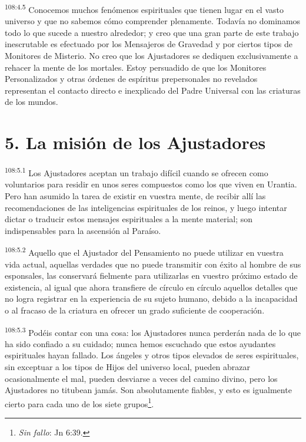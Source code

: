 \documentclass[twoside, 11pt]{book}
\begin{document}
\par
\textsuperscript{108:4.5} Conocemos muchos fenómenos espirituales que tienen lugar en el vasto universo y que no sabemos cómo comprender plenamente. Todavía no dominamos todo lo que sucede a nuestro alrededor; y creo que una gran parte de este trabajo inescrutable es efectuado por los Mensajeros de Gravedad y por ciertos tipos de Monitores de Misterio. No creo que los Ajustadores se dediquen exclusivamente a rehacer la mente de los mortales. Estoy persuadido de que los Monitores Personalizados y otras órdenes de espíritus prepersonales no revelados representan el contacto directo e inexplicado del Padre Universal con las criaturas de los mundos.

\section*{5. La misión de los Ajustadores}
\par
\textsuperscript{108:5.1} Los Ajustadores aceptan un trabajo difícil cuando se ofrecen como voluntarios para residir en unos seres compuestos como los que viven en Urantia. Pero han asumido la tarea de existir en vuestra mente, de recibir allí las recomendaciones de las inteligencias espirituales de los reinos, y luego intentar dictar o traducir estos mensajes espirituales a la mente material; son indispensables para la ascensión al Paraíso.

\par
\textsuperscript{108:5.2} Aquello que el Ajustador del Pensamiento no puede utilizar en vuestra vida actual, aquellas verdades que no puede transmitir con éxito al hombre de sus esponsales, las conservará fielmente para utilizarlas en vuestro próximo estado de existencia, al igual que ahora transfiere de círculo en círculo aquellos detalles que no logra registrar en la experiencia de su sujeto humano, debido a la incapacidad o al fracaso de la criatura en ofrecer un grado suficiente de cooperación.

\par
\textsuperscript{108:5.3} Podéis contar con una cosa: los Ajustadores nunca perderán nada de lo que ha sido confiado a su cuidado; nunca hemos escuchado que estos ayudantes espirituales hayan fallado. Los ángeles y otros tipos elevados de seres espirituales, sin exceptuar a los tipos de Hijos del universo local, pueden abrazar ocasionalmente el mal, pueden desviarse a veces del camino divino, pero los Ajustadores no titubean jamás. Son absolutamente fiables, y esto es igualmente cierto para cada uno de los siete grupos\footnote{\textit{Sin fallo}: Jn 6:39.}.
\end{document}
